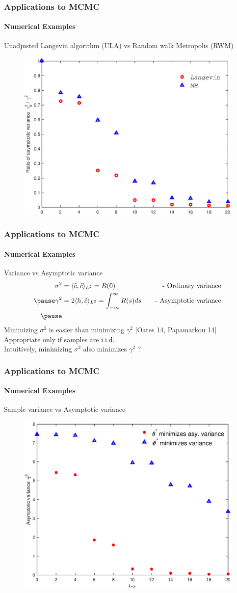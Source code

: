 \documentclass[xcolor=dvipsnames, subsection=false]{beamer}
\def\tilc{\tilde c}
\def\rd#1{{\color{red}#1}}
\def\bl#1{{\color{blue}#1}}
\begin{document}
\begin{frame}
\frametitle{Applications to MCMC}
\framesubtitle{Numerical Examples}
Unadjusted Langevin algorithm (ULA) vs Random walk Metropolis (RWM) \\[-0.2cm]
\begin{figure}[h]
	\includegraphics[width = .6\hsize]{rel_red_lang_mh_all.eps}
	\label{lang_mh}
\end{figure}
\end{frame}

\begin{frame}
\frametitle{Applications to MCMC}
\framesubtitle{Numerical Examples}
Variance vs Asymptotic variance
\[
\begin{aligned}
\sigma^2 &= \langle \tilc, \tilc\rangle_{L^2} = R(0) \quad &\text{- Ordinary variance}\\ \pause
\gamma^2 & = 2 \langle h, \tilc \rangle_{L^2}   = \int_{-\infty}^{\infty} R(s) ds \quad &\text{- Asymptotic variance} \\ \pause
\end{aligned}
\]
Minimizing $\sigma^2$ is easier than minimizing $\gamma^2$  \bl{[Oates 14,  Papamarkou 14] }\\[0.2cm]
Appropriate only if samples are i.i.d. \\[0.2cm]
Intuitively, minimizing $\sigma^2$ also minimizes $\gamma^2$ ? \pause \rd{NO !}
\end{frame}

\begin{frame}
\frametitle{Applications to MCMC}
\framesubtitle{Numerical Examples}
Sample variance vs Asymptotic variance
\begin{figure}[]
	\includegraphics[width = .6\hsize]{x_var_vs_asym_var.eps}
\end{figure}
\end{frame}
\end{document}
